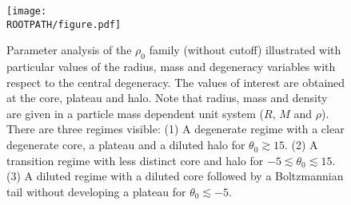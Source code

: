 \begin{figure}%
	\centering%
	\texttt{[image: \\ROOTPATH/figure.pdf]}
	\caption{Parameter analysis of the $\rho_0$ family (without cutoff) illustrated with particular values of the radius, mass and degeneracy variables with respect to the central degeneracy. The values of interest are obtained at the core, plateau and halo. Note that radius, mass and density are given in a particle mass dependent unit system ($R$, $M$ and $\rho$). There are three regimes visible: (1) A degenerate regime with a clear degenerate core, a plateau and a diluted halo for $\theta_0 \gtrsim 15$. (2) A transition regime with less distinct core and halo for $-5 \lesssim \theta_0 \lesssim 15$. (3) A diluted regime with a diluted core followed by a Boltzmannian tail without developing a plateau for $\theta_0 \lesssim -5$.}%
	\label{fig:analysis:without-cutoff:central-density:raw}%
\end{figure}